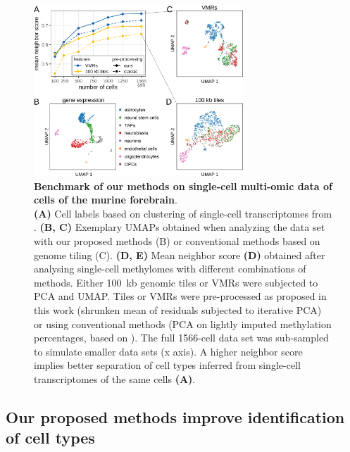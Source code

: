 \documentclass[twocolumn,10pt]{article}
\begin{document}
\begin{figure}[t]
    \begin{center}
        \includegraphics[width=0.7\textwidth]{figures/Fig_benchmark.png}
    \end{center}
    \caption{\small \textbf{Benchmark of our methods on single-cell multi-omic data of cells of the murine forebrain}.\\
    \textbf{(A)} Cell labels based on clustering of single-cell transcriptomes from \citet{kremer_scnmt}.
    \textbf{(B, C)} Exemplary UMAPs obtained when analyzing the data set with our proposed methods (B) or conventional methods based on genome tiling (C).
    \textbf{(D, E)} Mean neighbor score \textbf{(D)} obtained after analysing single-cell methylomes with different combinations of methods.
    Either 100~kb genomic tiles or VMRs were subjected to PCA and UMAP.
    Tiles or VMRs were pre-processed as proposed in this work (shrunken mean of residuals subjected to iterative PCA) or using conventional methods (PCA on lightly imputed methylation percentages, based on \citep{luo2017single}).
    The full 1566-cell data set was sub-sampled to simulate smaller data sets (x axis).
    A higher neighbor score implies better separation of cell types inferred from single-cell transcriptomes of the same cells \textbf{(A)}.
    }
    \label{fig:score}
\end{figure}

\subsection{Our proposed methods improve identification of cell types}
\end{document}
